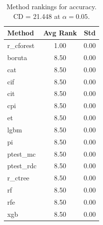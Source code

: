 \begin{table}[h]
\centering
\caption{Method rankings for accuracy. CD = 21.448 at $\alpha=0.05$.}
\label{tab:ranks_accuracy}
\begin{tabular}{lcc}
\toprule
Method & Avg Rank & Std \\
\midrule
r_cforest & 1.00 & 0.00 \\
boruta & 8.50 & 0.00 \\
cat & 8.50 & 0.00 \\
cif & 8.50 & 0.00 \\
cit & 8.50 & 0.00 \\
cpi & 8.50 & 0.00 \\
et & 8.50 & 0.00 \\
lgbm & 8.50 & 0.00 \\
pi & 8.50 & 0.00 \\
ptest_mc & 8.50 & 0.00 \\
ptest_rdc & 8.50 & 0.00 \\
r_ctree & 8.50 & 0.00 \\
rf & 8.50 & 0.00 \\
rfe & 8.50 & 0.00 \\
xgb & 8.50 & 0.00 \\
\bottomrule
\end{tabular}
\end{table}
